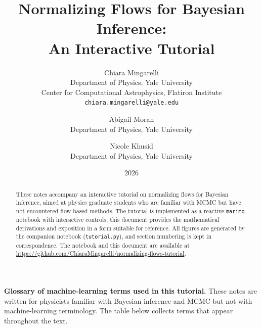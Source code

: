 \documentclass[11pt,letterpaper]{article}
\title{Normalizing Flows for Bayesian Inference:\\
An Interactive Tutorial}
\author{Chiara Mingarelli\\
\small Department of Physics, Yale University\\
\small Center for Computational Astrophysics, Flatiron Institute\\
\small \texttt{chiara.mingarelli@yale.edu}
\and
Abigail Moran\\
\small Department of Physics, Yale University
\and
Nicole Khusid\\
\small Department of Physics, Yale University}
\date{2026}
\begin{document}
\maketitle

\begin{abstract}
These notes accompany an interactive tutorial on normalizing flows
for Bayesian inference, aimed at physics graduate students who are
familiar with MCMC but have not encountered flow-based methods.
The tutorial is implemented as a reactive \texttt{marimo} notebook
with interactive controls; this document provides the mathematical
derivations and exposition in a form suitable for reference.
All figures are generated by the companion notebook
(\texttt{tutorial.py}), and section numbering is kept in correspondence.
The notebook and this document are available at
\url{https://github.com/ChiaraMingarelli/normalizing-flows-tutorial}.
\end{abstract}

 \newpage 
\vspace{1em}
\noindent\textbf{Glossary of machine-learning terms used in this tutorial.}
These notes are written for physicists familiar with Bayesian inference
and MCMC but not with machine-learning terminology.
The table below collects terms that appear throughout the text.
 
\end{document}
